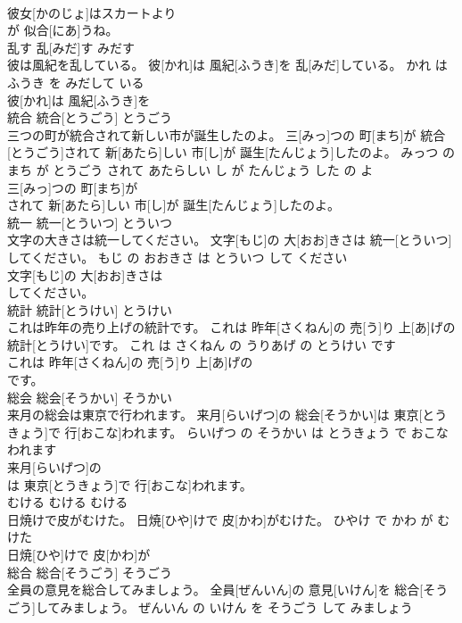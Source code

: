 \documentclass[8pt]{extreport}
\begin{document}
\begin{CJK}{UTF8}{min}
\\	彼女[かのじょ]はスカートより
\\	が 似合[にあ]うね。			
\\	乱す	乱[みだ]す	みだす	
\\	彼は風紀を乱している。	彼[かれ]は 風紀[ふうき]を 乱[みだ]している。	かれ は ふうき を みだして いる	
\\	彼[かれ]は 風紀[ふうき]を
\\	統合	統合[とうごう]	とうごう	
\\	三つの町が統合されて新しい市が誕生したのよ。	三[みっ]つの 町[まち]が 統合[とうごう]されて 新[あたら]しい 市[し]が 誕生[たんじょう]したのよ。	みっつ の まち が とうごう されて あたらしい し が たんじょう した の よ	
\\	三[みっ]つの 町[まち]が
\\	されて 新[あたら]しい 市[し]が 誕生[たんじょう]したのよ。			
\\	統一	統一[とういつ]	とういつ	
\\	文字の大きさは統一してください。	文字[もじ]の 大[おお]きさは 統一[とういつ]してください。	もじ の おおきさ は とういつ して ください	
\\	文字[もじ]の 大[おお]きさは
\\	してください。			
\\	統計	統計[とうけい]	とうけい	
\\	これは昨年の売り上げの統計です。	これは 昨年[さくねん]の 売[う]り 上[あ]げの 統計[とうけい]です。	これ は さくねん の うりあげ の とうけい です	
\\	これは 昨年[さくねん]の 売[う]り 上[あ]げの
\\	です。			
\\	総会	総会[そうかい]	そうかい	
\\	来月の総会は東京で行われます。	来月[らいげつ]の 総会[そうかい]は 東京[とうきょう]で 行[おこな]われます。	らいげつ の そうかい は とうきょう で おこなわれます	
\\	来月[らいげつ]の
\\	は 東京[とうきょう]で 行[おこな]われます。			
\\	むける	むける	むける	
\\	日焼けで皮がむけた。	日焼[ひや]けで 皮[かわ]がむけた。	ひやけ で かわ が むけた	
\\	日焼[ひや]けで 皮[かわ]が
\\	総合	総合[そうごう]	そうごう	
\\	全員の意見を総合してみましょう。	全員[ぜんいん]の 意見[いけん]を 総合[そうごう]してみましょう。	ぜんいん の いけん を そうごう して みましょう	

\end{CJK}
\end{document}
